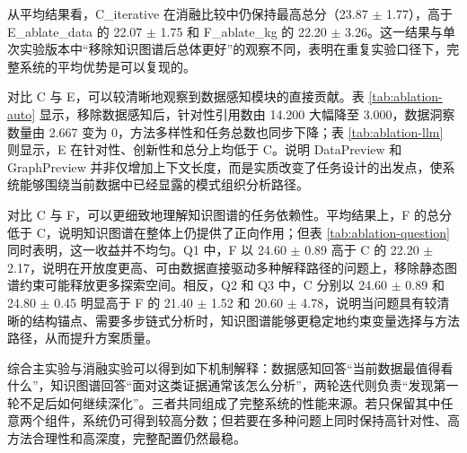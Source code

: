 \begin{table}[htbp]
\centering
\caption{组件消融问题级 LLM 总分明细（均值 $\pm$ 标准差）}
\label{tab:ablation-question}
\end{table}

从平均结果看，C\_iterative 在消融比较中仍保持最高总分（23.87 $\pm$ 1.77），高于 E\_ablate\_data 的 22.07 $\pm$ 1.75 和 F\_ablate\_kg 的 22.20 $\pm$ 3.26。这一结果与单次实验版本中“移除知识图谱后总体更好”的观察不同，表明在重复实验口径下，完整系统的平均优势是可以复现的。

对比 C 与 E，可以较清晰地观察到数据感知模块的直接贡献。表 \ref{tab:ablation-auto} 显示，移除数据感知后，针对性引用数由 14.200 大幅降至 3.000，数据洞察数量由 2.667 变为 0，方法多样性和任务总数也同步下降；表 \ref{tab:ablation-llm} 则显示，E 在针对性、创新性和总分上均低于 C。说明 DataPreview 和 GraphPreview 并非仅增加上下文长度，而是实质改变了任务设计的出发点，使系统能够围绕当前数据中已经显露的模式组织分析路径。

对比 C 与 F，可以更细致地理解知识图谱的任务依赖性。平均结果上，F 的总分低于 C，说明知识图谱在整体上仍提供了正向作用；但表 \ref{tab:ablation-question} 同时表明，这一收益并不均匀。Q1 中，F 以 24.60 $\pm$ 0.89 高于 C 的 22.20 $\pm$ 2.17，说明在开放度更高、可由数据直接驱动多种解释路径的问题上，移除静态图谱约束可能释放更多探索空间。相反，Q2 和 Q3 中，C 分别以 24.60 $\pm$ 0.89 和 24.80 $\pm$ 0.45 明显高于 F 的 21.40 $\pm$ 1.52 和 20.60 $\pm$ 4.78，说明当问题具有较清晰的结构锚点、需要多步链式分析时，知识图谱能够更稳定地约束变量选择与方法路径，从而提升方案质量。

综合主实验与消融实验可以得到如下机制解释：数据感知回答“当前数据最值得看什么”，知识图谱回答“面对这类证据通常该怎么分析”，两轮迭代则负责“发现第一轮不足后如何继续深化”。三者共同组成了完整系统的性能来源。若只保留其中任意两个组件，系统仍可得到较高分数；但若要在多种问题上同时保持高针对性、高方法合理性和高深度，完整配置仍然最稳。

